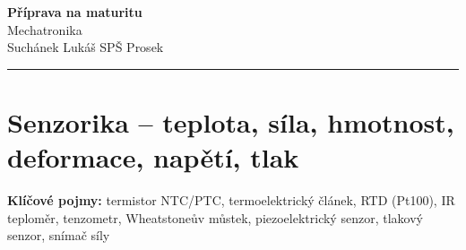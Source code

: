 \documentclass[a4paper,10pt]{article}
\begin{document}
\begin{minipage}[t]{0.75\textwidth}
    {\Huge\bfseries\color{accent} Příprava na maturitu}\\[4pt]
    {\large\color{stripeblue} Mechatronika}\\[2pt]
    \textcolor{medgray}{\small Suchánek Lukáš \quad SPŠ Prosek }
\end{minipage}
\hfill
\begin{minipage}[t]{0.22\textwidth}
    \raggedleft
\end{minipage}

\vspace{6pt}
\noindent\color{accent}\rule{\linewidth}{1.5pt}
\vspace{2pt}

\section{Senzorika -- teplota, síla, hmotnost, deformace, napětí, tlak}

\begin{pojmybox}
\textbf{Klíčové pojmy:}
termistor NTC/PTC, termoelektrický článek, RTD (Pt100),
IR teploměr, tenzometr, Wheatstoneův můstek, piezoelektrický senzor,
tlakový senzor, snímač síly
\end{pojmybox}
\end{document}
